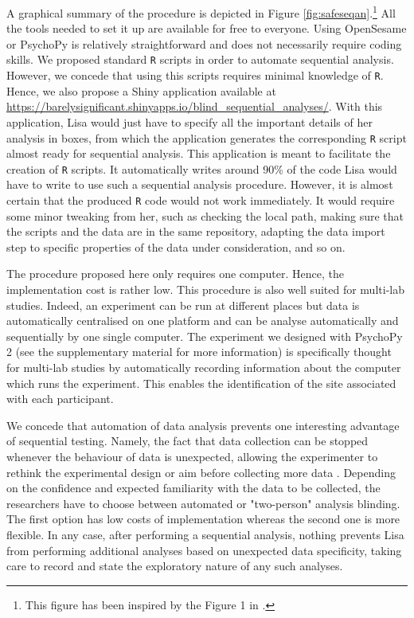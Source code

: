 \documentclass[a4paper,jou,natbib,floatsintext,donotrepeattitle]{apa6}
\begin{document}
A graphical summary of the procedure is depicted in Figure \ref{fig:safeseqan}.\footnote{This figure has been inspired by the Figure 1 in \cite{quintana_guidelines_2016}.} All the tools needed to set it up are available for free to everyone. Using OpenSesame or PsychoPy is relatively straightforward and does not necessarily require coding skills. We proposed standard \texttt{R} scripts in order to automate sequential analysis. However, we concede that using this scripts requires minimal knowledge of \texttt{R}. Hence, we also propose a Shiny application available at \url{https://barelysignificant.shinyapps.io/blind_sequential_analyses/}. With this application, Lisa would just have to specify all the important details of her analysis in boxes, from which the application generates the corresponding \texttt{R} script almost ready for sequential analysis. This application is meant to facilitate the creation of \texttt{R} scripts. It automatically writes around 90\% of the code Lisa would have to write to use such a sequential analysis procedure. However, it is almost certain that the produced \texttt{R} code would not work immediately. It would require some minor tweaking from her, such as checking the local path, making sure that the scripts and the data are in the same repository, adapting the data import step to specific properties of the data under consideration, and so on.

The procedure proposed here only requires one computer. Hence, the implementation cost is rather low. This procedure is also well suited for multi-lab studies. Indeed, an experiment can be run at different places but data is automatically centralised on one platform  and can be analyse automatically and sequentially by one single computer. The experiment we designed with PsychoPy 2 (see the supplementary material for more information) is specifically thought for multi-lab studies by automatically recording information about the computer which runs the experiment. This enables the identification of the site associated with each participant. 

We concede that automation of data analysis prevents one interesting advantage of sequential testing. Namely, the fact that data collection can be stopped whenever the behaviour of data is unexpected, allowing the experimenter to rethink the experimental design or aim before collecting more data \citep{lakens_performing_2014}. Depending on the confidence and expected familiarity with the data to be collected, the researchers have to choose between automated or "two-person" analysis blinding. The first option has low costs of implementation whereas the second one is more flexible. In any case, after performing a sequential analysis, nothing prevents Lisa from performing additional analyses based on unexpected data specificity, taking care to record and state the exploratory nature of any such analyses.
\end{document}
